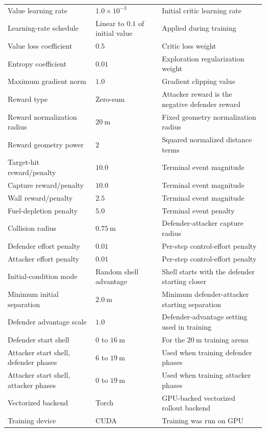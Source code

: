 \begin{longtable}{@{}p{}p{}p{}@{}}
Value learning rate & $1.0\times10^{-3}$ & Initial critic learning rate \\
Learning-rate schedule & Linear to $0.1$ of initial value & Applied during training \\
Value loss coefficient & $0.5$ & Critic loss weight \\
Entropy coefficient & $0.01$ & Exploration regularization weight \\
Maximum gradient norm & $1.0$ & Gradient clipping value \\
Reward type & Zero-sum & Attacker reward is the negative defender reward \\
Reward normalization radius & $20~\mathrm{m}$ & Fixed geometry normalization radius \\
Reward geometry power & $2$ & Squared normalized distance terms \\
Target-hit reward/penalty & $10.0$ & Terminal event magnitude \\
Capture reward/penalty & $10.0$ & Terminal event magnitude \\
Wall reward/penalty & $2.5$ & Terminal event magnitude \\
Fuel-depletion penalty & $5.0$ & Terminal event penalty \\
Collision radius & $0.75~\mathrm{m}$ & Defender-attacker capture radius \\
Defender effort penalty & $0.01$ & Per-step control-effort penalty \\
Attacker effort penalty & $0.01$ & Per-step control-effort penalty \\
Initial-condition mode & Random shell advantage & Shell starts with the defender starting closer \\
Minimum initial separation & $2.0~\mathrm{m}$ & Minimum defender-attacker starting separation \\
Defender advantage scale & $1.0$ & Defender-advantage setting used in training \\
Defender start shell & $0$ to $16~\mathrm{m}$ & For the $20~\mathrm{m}$ training arena \\
Attacker start shell, defender phases & $6$ to $19~\mathrm{m}$ & Used when training defender phases \\
Attacker start shell, attacker phases & $0$ to $19~\mathrm{m}$ & Used when training attacker phases \\
Vectorized backend & Torch & GPU-backed vectorized rollout backend \\
Training device & CUDA & Training was run on GPU \\
\end{longtable}

